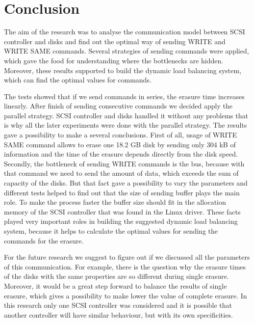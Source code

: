 \chapter{Conclusion}
\label{chap6:title}

The aim of the research was to analyse the communication model between SCSI controller and disks and find out the optimal way of sending WRITE and WRITE SAME commands. Several strategies of sending commands were applied, which gave the food for understanding where the bottlenecks are hidden. Moreover, these results supported to build the dynamic load balancing system, which can find the optimal values for commands.

The tests showed that if we send commands in series, the erasure time increases linearly. After finish of sending consecutive commands we decided apply the parallel strategy. SCSI controller and disks handled it without any problems that is why all the later experiments were done with the parallel strategy. The results gave a possibility to make a several conclusions. First of all, usage of WRITE SAME command allows to erase one 18.2 GB disk by sending only 304 kB of information and the time of the erasure depends directly from the disk speed. Secondly, the bottleneck of sending WRITE commands is the bus, because with that command we need to send the amount of data, which exceeds the sum of capacity of the disks. But that fact gave a possibility to vary the parameters and different tests helped to find out that the size of sending buffer plays the main role. To make the process faster the buffer size should fit in the allocation memory of the SCSI controller that was found in the Linux driver. These facts played very important roles in building the suggested dynamic load balancing system, because it helps to calculate the optimal values for sending the commands for the erasure.

For the future research we suggest to figure out if we discussed all the parameters of this communication. For example, there is the question why the erasure times of the disks with the same properties are so different during single erasure. Moreover, it would be a great step forward to balance the results of single erasure, which gives a possibility to make lower the value of complete erasure. In this research only one SCSI controller was considered and it is possible that another controller will have similar behaviour, but with its own specificities.